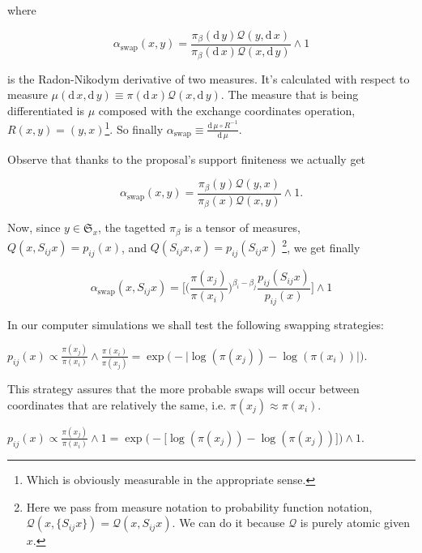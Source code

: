 where 

	$$\alpha_\text{swap}(x,y) = \frac{\pi_\beta( \mathrm{d}\, y ) \mathcal{Q}(y, \mathrm{d}\,x)}{\pi_\beta( \mathrm{d}\, x ) \mathcal{Q}(x, \mathrm{d}\,y)} \wedge 1$$

is the Radon-Nikodym derivative of two measures. It's calculated with respect to measure $ \mu (\mathrm{d}\,x, \mathrm{d}\,y) \equiv \pi(\mathrm{d}\,x) \mathcal{Q}(x, \mathrm{d}\,y)$. The measure that is being differentiated is $\mu$ composed with the exchange coordinates operation, $R(x,y) = (y,x)$\footnote{Which is obviously measurable in the appropriate sense.}. So finally $\alpha_\text{swap} \equiv \frac{\mathrm{d}\, \mu \circ R^{-1}}{\mathrm{d}\, \mu}$.

Observe that thanks to the proposal's support finiteness we actually get 

	$$\alpha_\text{swap}(x,y) =  \frac{\pi_\beta( y ) \mathcal{Q}(y, x)}{\pi_\beta( x ) \mathcal{Q}(x, y)} \wedge 1.$$


Now, since $y \in \mathfrak{S}_x $, the tagetted $\pi_\beta$ is a tensor of measures, $Q(x, S_{ij} x) = p_{ij}(x)$, and $Q( S_{ij} x, x) = p_{ij}(S_{ij}x)$ \footnote{Here we pass from measure notation to probability function notation, $\mathcal{Q}(x, \{S_{ij}x \}) = \mathcal{Q}(x, S_{ij}x)$. We can do it because $\mathcal{Q}$ is purely atomic given $x$.}, we get finally 

\begin{equation*}
	\alpha_\text{swap}(x,S_{ij} x) = \Big[  \Big(\frac{\pi(x_j)}{\pi(x_i)} \Big)^{\beta_i - \beta_j}  \frac{ p_{ij}(S_{ij} x )}{ p_{ij}( x ) }\Big] \wedge 1
\end{equation*}	

In our computer simulations we shall test the following swapping strategies:

\begin{strategy}
	\item 
		$
			p_{ij}(x) \propto 
			\frac{\pi (x_j)}{\pi( x_i )} \wedge \frac{\pi (x_i)}{\pi( x_j )} = 
			\exp \Big( - \big| \log ( \pi(x_j) ) - \log ( \pi(x_i) ) \big| \Big).
		$ 
\end{strategy}

This strategy assures that the more probable swaps will occur between coordinates that are relatively the same, i.e. $\pi (x_j) \approx \pi (x_i)$. 

\begin{strategy}[resume]
	\item 
		$
			p_{ij}(x) \propto 
			\frac{\pi (x_j)}{\pi (x_i)} \wedge 1 = 
			\exp \Big( - \big[ \log ( \pi(x_j) ) - \log ( \pi(x_j) ) \big]\Big) \wedge 1.$
\end{strategy}

